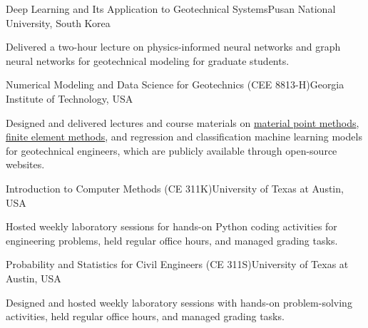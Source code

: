 %

  {Deep Learning and Its Application to Geotechnical Systems}{Pusan National University, South Korea}
\begin{cvbullets}
  \item Delivered a two-hour lecture on physics-informed neural networks and graph neural networks for geotechnical modeling for graduate students.
\end{cvbullets}

  {Numerical Modeling and Data Science for Geotechnics (CEE 8813-H)}{Georgia Institute of Technology, USA}
\begin{cvbullets}
  \item Designed and delivered lectures and course materials on
    \href{https://yjchoi1.github.io/learn-mpm-2d/main_page.html}{material point methods},
    \href{https://github.com/yjchoi1/fem-geotech-tutorial/tree/main}{finite element methods},
    and regression and classification machine learning models for geotechnical engineers, which are publicly available through open-source websites.
\end{cvbullets}


  {Introduction to Computer Methods (CE 311K)}{University of Texas at Austin, USA}
\begin{cvbullets}
  \item Hosted weekly laboratory sessions for hands-on Python coding activities for engineering problems, held regular office hours, and managed grading tasks.
\end{cvbullets}

  {Probability and Statistics for Civil Engineers (CE 311S)}{University of Texas at Austin, USA}
\begin{cvbullets}
  \item Designed and hosted weekly laboratory sessions with hands-on problem-solving activities, held regular office hours, and managed grading tasks.
\end{cvbullets}
